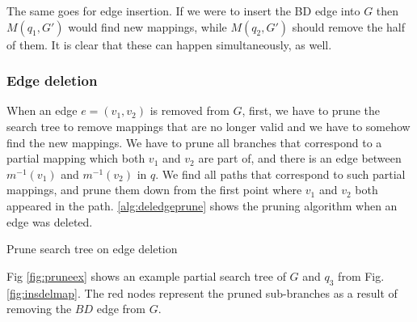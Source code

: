 The same goes for edge insertion. If we were to insert the BD edge into $G$ then
$M(q_1, G')$ would find new mappings, while $M(q_2, G')$ should remove the half 
of them. It is clear that these can happen simultaneously, as well.

\subsubsection{Edge deletion}

When an edge $e = (v_1, v_2)$ is removed from $G$, first, we have to prune the search
tree to remove mappings that are no longer valid and we have to somehow find the new 
mappings. We have to prune all branches that correspond to a partial mapping which both
$v_1$ and $v_2$ are part of, and there is an edge between $m^{-1}(v_1)$ and $m^{-1}(v_2)$ 
in $q$. We find all paths that correspond to such partial mappings, and prune them down
from the first point where $v_1$ and $v_2$ both appeared in the path. \ref{alg:deledgeprune}
shows the pruning algorithm when an edge was deleted.

\begin{algorithm}[htp]
    \caption{Prune search tree on edge deletion}
    \label{alg:deledgeprune}
    \SetAlgoLined\DontPrintSemicolon    
    
\end{algorithm}

Fig \ref{fig:pruneex} shows an example partial search tree of $G$ and $q_3$ from Fig. \ref{fig:insdelmap}.
The red nodes represent the pruned sub-branches as a result of removing the $BD$ edge from $G$.

